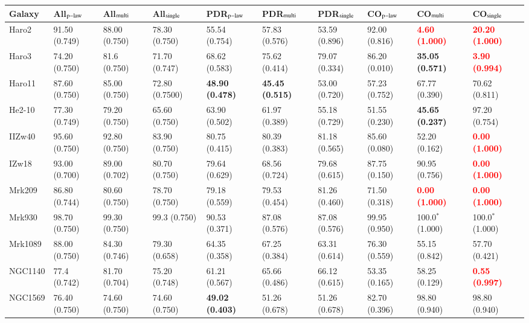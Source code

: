 \documentclass{aa}
\begin{document}
\begin{appendix}
\begin{table}[h!]
\begin{threeparttable}
\begin{tabular}{|p{}|p{}p{}p{}|p{}p{}p{}|p{}p{}p{}|}
\hline
Galaxy& All$_{\rm p-law}$&All$_{\rm multi}$&All$_{\rm single}$&PDR$_{\rm p-law}$&PDR$_{\rm multi}$&PDR$_{\rm single}$&CO$_{\rm p-law}$&CO$_{\rm multi}$&CO$_{\rm single}$\\
\hline
Haro2&91.50 (0.749)&88.00 (0.750)&78.30 (0.750)&55.54 (0.754)&57.83 (0.576)&53.59 (0.896)&92.00 (0.816)&\textbf{\textcolor{red}{4.60 (1.000)}}&\textbf{\textcolor{red}{20.20 (1.000)}}\\
Haro3&74.20 (0.750)&81.6 (0.750)&71.70 (0.747)&68.62 (0.583)&75.62 (0.414)&79.07 (0.334)&86.20 (0.010)&\textbf{35.05 (0.571)}&\textbf{\textcolor{red}{3.90 (0.994)}}\\
Haro11&87.60 (0.750)&85.00 (0.750)&72.80 (0.7500)&\textbf{48.90 (0.478)}&\textbf{45.45 (0.515)}&53.00 (0.720)&57.23 (0.752)&67.77 (0.390)&70.62 (0.811)\\
He2-10&77.30 (0.749)&79.20 (0.750)&65.60 (0.750)&63.90 (0.502)&61.97 (0.389)&55.18 (0.729)&51.55 (0.230)&\textbf{45.65 (0.237)}&97.20 (0.754)\\
IIZw40&95.60 (0.750)&92.80 (0.750)&83.90 (0.750)&80.75 (0.415)&80.39 (0.383)&81.18 (0.565)&85.60 (0.080)&52.20 (0.162)&\textbf{\textcolor{red}{0.00 (1.000)}}\\
IZw18&93.00 (0.700)&89.00 (0.702)&80.70 (0.750)&79.64 (0.629)&68.56 (0.724)&79.68 (0.615)&87.75 (0.150)&90.95 (0.756)&\textbf{\textcolor{red}{0.00 (1.000)}}\\
Mrk209&86.80 (0.744)&80.60 (0.750)&78.70 (0.750)&79.18 (0.559)&79.53 (0.454)&81.26 (0.460)&71.50 (0.318)&\textbf{\textcolor{red}{0.00 (1.000)}}&\textbf{\textcolor{red}{0.00 (1.000)}}\\
Mrk930&98.70 (0.750)&99.30 (0.750)&99.3 (0.750)&90.53 (0.371)&87.08 (0.576)&87.08 (0.576)&99.95 (0.950)&100.0$^*$ (1.000)&100.0$^*$ (1.000)\\
Mrk1089&88.00 (0.750)&84.30 (0.746)&79.30 (0.658)&64.35 (0.358)&67.25 (0.384)&63.31 (0.614)&76.30 (0.559)&55.15 (0.842)&57.70 (0.421)\\
NGC1140&77.4 (0.742)&81.70 (0.704)&75.20 (0.748)&61.21 (0.567)&65.66 (0.486)&66.12 (0.615)&53.35 (0.165)&58.25 (0.129)&\textbf{\textcolor{red}{0.55 (0.997)}}\\
NGC1569&76.40 (0.750)&74.60 (0.750)&74.60 (0.750)&\textbf{49.02 (0.403)}&51.26 (0.678)&51.26 (0.678)&82.70 (0.396)&98.80 (0.940)&98.80 (0.940)\\

\end{tabular}
\end{threeparttable}
\end{table}
\end{appendix}
\end{document}

